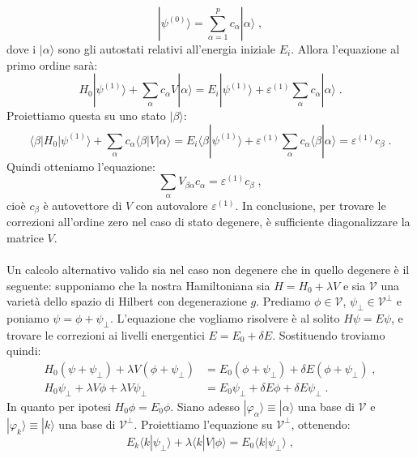 \documentclass[10pt,a4paper]{report}
\theoremstyle{definition}
\numberwithin{equation}{section}
\newcommand{\bra}{\langle}
\newcommand{\ket}{\rangle}
\begin{document}
\begin{equation}
|\psi^{(0)}\ket=\sum_{\alpha=1}^p c_{\alpha}|\alpha\ket\;,
\end{equation}
dove i $|\alpha\ket$ sono gli autostati relativi all'energia iniziale $E_i$. Allora l'equazione al primo ordine sarà:
\begin{equation}
H_0|\psi^{(1)}\ket+\sum_{\alpha} c_{\alpha} V|\alpha\ket=E_i|\psi^{(1)}\ket+\varepsilon^{(1)}\sum_{\alpha} c_{\alpha}|\alpha\ket\;.
\end{equation}
Proiettiamo questa su uno stato $|\beta\ket$:
\begin{equation}
\bra \beta|H_0|\psi^{(1)}\ket+\sum_{\alpha} c_{\alpha}\bra\beta|V|\alpha\ket=E_i\bra\beta|\psi^{(1)}\ket+\varepsilon^{(1)}\sum_{\alpha}c_{\alpha}\bra\beta|\alpha\ket=\varepsilon^{(1)}c_{\beta}\;.
\end{equation}
Quindi otteniamo l'equazione:
\begin{equation}
\sum_{\alpha} V_{\beta\alpha}c_{\alpha}=\varepsilon^{(1)}c_{\beta}\;,
\end{equation}
cioè $c_{\beta}$ è autovettore di $V$ con autovalore $\varepsilon^{(1)}$. In conclusione, per trovare le correzioni all'ordine zero nel caso di stato degenere, è sufficiente diagonalizzare la matrice $V$. \\
\\
Un calcolo alternativo valido sia nel caso non degenere che in quello degenere è il seguente: supponiamo che la nostra Hamiltoniana sia $H=H_0+\lambda V$ e sia $\mathcal{V}$ una varietà dello spazio di Hilbert con degenerazione $g$. Prediamo $\phi\in \mathcal{V}$, $\psi_{\perp}\in\mathcal{V}^{\perp}$ e poniamo $\psi=\phi+\psi_{\perp}$. L'equazione che vogliamo risolvere è al solito $H\psi=E\psi$, e trovare le correzioni ai livelli energentici $E=E_0+\delta E$. Sostituendo troviamo quindi:
\begin{align*}
H_0(\psi+\psi_{\perp})+\lambda V(\phi+\psi_{\perp}) &=E_0(\phi+\psi_{\perp})+\delta E(\phi+\psi_{\perp})\;, \\
H_0\psi_{\perp}+\lambda V\phi+\lambda V\psi_{\perp} &= E_0\psi_{\perp}+\delta E\phi+\delta E\psi_{\perp}\;.
\end{align*}
In quanto per ipotesi $H_0\phi=E_0\phi$. Siano adesso $|\varphi_{\alpha}\ket\equiv |\alpha\ket$ una base di $\mathcal{V}$ e $|\varphi_k\ket\equiv|k\ket$ una base di $\mathcal{V}^{\perp}$. Proiettiamo l'equazione su $\mathcal{V}^{\perp}$, ottenendo:
\begin{equation}
E_k\bra k|\psi_{\perp}\ket+\lambda\bra k|V|\phi\ket=E_0\bra k|\psi_{\perp}\ket\;,
\end{equation}
\end{document}
